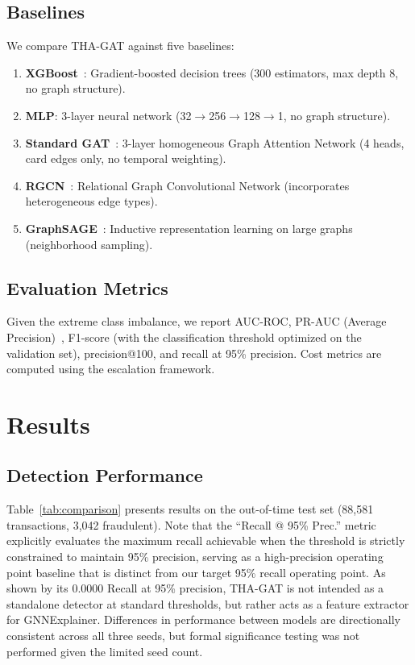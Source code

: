 \documentclass[journal]{IEEEtran}
\begin{document}
\subsection{Baselines}
We compare THA-GAT against five baselines:
\begin{enumerate}
    \item \textbf{XGBoost}~\cite{chen2016xgboost}: Gradient-boosted decision trees (300 estimators, max depth 8, no graph structure).
    \item \textbf{MLP}: 3-layer neural network (32$\to$256$\to$128$\to$1, no graph structure).
    \item \textbf{Standard GAT}~\cite{velickovic2018gat}: 3-layer homogeneous Graph Attention Network (4 heads, card edges only, no temporal weighting).
    \item \textbf{RGCN}~\cite{schlichtkrull2018modeling}: Relational Graph Convolutional Network (incorporates heterogeneous edge types).
    \item \textbf{GraphSAGE}~\cite{hamilton2017graphsage}: Inductive representation learning on large graphs (neighborhood sampling).
\end{enumerate}

\subsection{Evaluation Metrics}
Given the extreme class imbalance, we report AUC-ROC, PR-AUC (Average Precision)~\cite{davis2006pr}, F1-score (with the classification threshold optimized on the validation set), precision@100, and recall at 95\% precision. Cost metrics are computed using the escalation framework.

\section{Results}
\label{sec:results}

\subsection{Detection Performance}

Table~\ref{tab:comparison} presents results on the out-of-time test set (88,581 transactions, 3,042 fraudulent). Note that the ``Recall @ 95\% Prec.'' metric explicitly evaluates the maximum recall achievable when the threshold is strictly constrained to maintain 95\% precision, serving as a high-precision operating point baseline that is distinct from our target 95\% recall operating point. As shown by its 0.0000 Recall at 95\% precision, THA-GAT is not intended as a standalone detector at standard thresholds, but rather acts as a feature extractor for GNNExplainer. Differences in performance between models are directionally consistent across all three seeds, but formal significance testing was not performed given the limited seed count.
\end{document}
